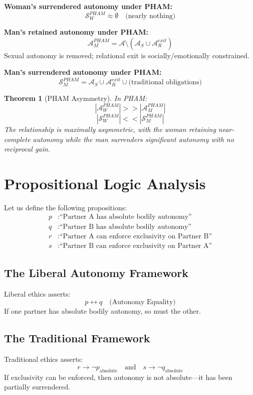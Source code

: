 \documentclass[12pt,openany]{book}
\newtheorem{theorem}{Theorem}[chapter]
\numberwithin{equation}{chapter}
\begin{document}
\textbf{Woman's surrendered autonomy under PHAM:}
\[
\mathcal{S}_W^{PHAM} \approx \emptyset \quad \text{(nearly nothing)}
\]

\textbf{Man's retained autonomy under PHAM:}
\[
\mathcal{A}_M^{PHAM} = \mathcal{A} \setminus (\mathcal{A}_S \cup \mathcal{A}_R^{exit})
\]
Sexual autonomy is removed; relational exit is socially/emotionally constrained.

\textbf{Man's surrendered autonomy under PHAM:}
\[
\mathcal{S}_M^{PHAM} = \mathcal{A}_S \cup \mathcal{A}_R^{exit} \cup \text{(traditional obligations)}
\]

\begin{theorem}[PHAM Asymmetry]
In PHAM:
\[
|\mathcal{A}_W^{PHAM}| >> |\mathcal{A}_M^{PHAM}|
\]
\[
|\mathcal{S}_W^{PHAM}| << |\mathcal{S}_M^{PHAM}|
\]
The relationship is maximally asymmetric, with the woman retaining near-complete autonomy while the man surrenders significant autonomy with no reciprocal gain.
\end{theorem}

\section{Propositional Logic Analysis}

Let us define the following propositions:
\begin{align*}
p &: \text{``Partner A has absolute bodily autonomy''} \\
q &: \text{``Partner B has absolute bodily autonomy''} \\
r &: \text{``Partner A can enforce exclusivity on Partner B''} \\
s &: \text{``Partner B can enforce exclusivity on Partner A''}
\end{align*}

\subsection{The Liberal Autonomy Framework}

Liberal ethics asserts:
\[
p \leftrightarrow q \quad \text{(Autonomy Equality)}
\]
If one partner has absolute bodily autonomy, so must the other.

\subsection{The Traditional Framework}

Traditional ethics asserts:
\[
r \rightarrow \neg p_{\text{absolute}} \quad \text{and} \quad s \rightarrow \neg q_{\text{absolute}}
\]
If exclusivity can be enforced, then autonomy is not absolute---it has been partially surrendered.
\end{document}
